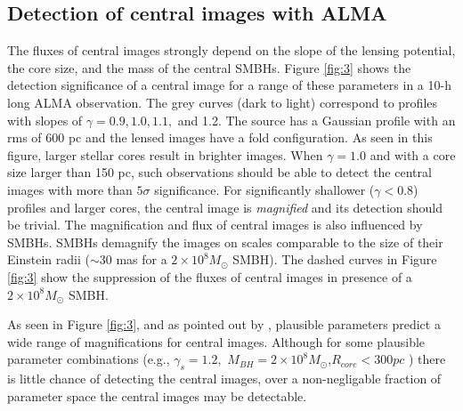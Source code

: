 \documentclass[chicago]{emulateapj}
\newcommand{\red}{\textcolor{red}}
\begin{document}
\subsection{Detection of central images with ALMA}
The fluxes of central images strongly depend on the slope of the lensing potential, the core size, and the mass of the central SMBHs.  Figure \ref{fig:3} shows the detection significance of a central image for a range of these parameters in a 10-h long ALMA observation. The grey curves (dark to light) correspond to profiles with slopes of $\gamma=0.9, 1.0, 1.1,$ and 1.2.  
The source has a Gaussian profile with an rms of 600 pc and the lensed images have a fold configuration. 
As seen in this figure, larger stellar cores result in brighter images. %
When $\gamma=1.0$ and with a core size larger than 150 pc, such observations should be able to detect the central images with more than $5\sigma$ significance. For significantly shallower ($\gamma<0.8$) profiles and larger cores, the central image is \emph{magnified} and its detection should be trivial.  The magnification and flux of central images is also influenced by SMBHs.
SMBHs demagnify the images on scales comparable to the size of their Einstein radii ($\sim30$ mas for a $2\times10^8M_{\odot}$ SMBH).
The dashed curves in Figure \ref{fig:3} show the suppression of the fluxes of central images in presence of a $2\times10^8M_{\odot}$ SMBH.

As seen in Figure \ref{fig:3}, and as pointed out by \citet{Keeton:03}, plausible parameters predict  a wide range of magnifications for   central images. Although for some plausible parameter combinations (e.g., $\gamma_{s}=1.2,$ $M_{BH} = 2\times10^8 M_{\odot}$,$R_{core}<300 pc$ ) there is little chance of detecting the central images, over a non-negligable fraction of parameter space the central images may be detectable. 
\end{document}
